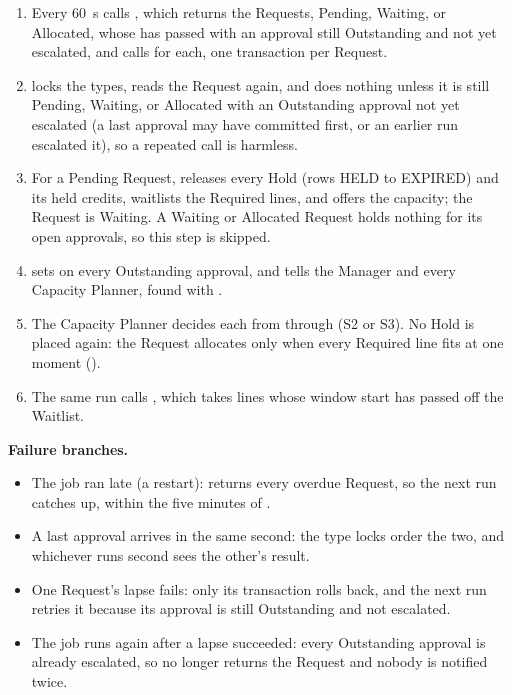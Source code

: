 \begin{enumerate}
\item Every 60~s  calls , which returns the Requests, Pending, Waiting, or Allocated, whose  has passed with an approval still Outstanding and not yet escalated, and calls  for each, one transaction per Request.
\item {} locks the types, reads the Request again, and does nothing unless it is still Pending, Waiting, or Allocated with an Outstanding approval not yet escalated (a last approval may have committed first, or an earlier run escalated it), so a repeated call is harmless.
\item For a Pending Request,  releases every Hold (rows HELD to EXPIRED) and its held credits, waitlists the Required lines, and offers the capacity; the Request is Waiting. A Waiting or Allocated Request holds nothing for its open approvals, so this step is skipped.
\item {} sets  on every Outstanding approval, and  tells the Manager and every Capacity Planner, found with .
\item The Capacity Planner decides each from  through  (S2 or S3). No Hold is placed again: the Request allocates only when every Required line fits at one moment ().
\item The same run calls , which takes lines whose window start has passed off the Waitlist.
\end{enumerate}
\par\textbf{Failure branches.}
\begin{itemize}
\item The job ran late (a restart):  returns every overdue Request, so the next run catches up, within the five minutes of .
\item A last approval arrives in the same second: the type locks order the two, and whichever runs second sees the other's result.
\item One Request's lapse fails: only its transaction rolls back, and the next run retries it because its approval is still Outstanding and not escalated.
\item The job runs again after a lapse succeeded: every Outstanding approval is already escalated, so  no longer returns the Request and nobody is notified twice.
\end{itemize}

